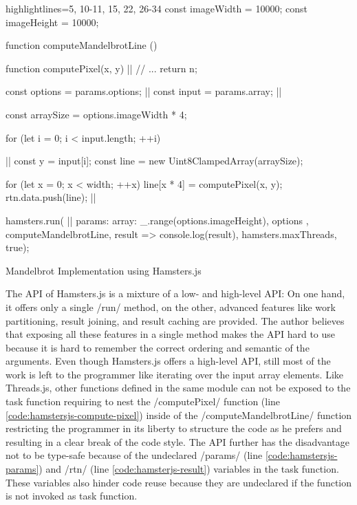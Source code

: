 \begin{listing}
\begin{javascriptcode*}{highlightlines={5, 10-11, 15, 22, 26-34}}
const imageWidth = 10000;
const imageHeight = 10000;

function computeMandelbrotLine () {
	function computePixel(x, y) {|$\label{code:hamstersjs-compute-pixel}$|
		// ...
		return n;
	}

	const options = params.options; |$\label{code:hamstersjs-params}$|
	const input = params.array; |$\label{code:hamstersjs-params-two}$|

	const arraySize = options.imageWidth * 4;

	for (let i = 0; i < input.length; ++i) {|$\label{code:hamsterjs-iterate}$|
		const y = input[i];
		const line = new Uint8ClampedArray(arraySize);
		
		for (let x = 0; x < width; ++x) {
			line[x * 4] = computePixel(x, y);
		}
		rtn.data.push(line); |$\label{code:hamsterjs-result}$|
	}
}

hamsters.run( |$\label{code:hamsterjs-start}$|
	params: {
		array: _.range(options.imageHeight),
		options
	},  
	computeMandelbrotLine, 
	result => console.log(result), 
	hamsters.maxThreads, 
	true);
\end{javascriptcode*}
\caption{Mandelbrot Implementation using Hamsters.js}
\label{fig:mandelbrot-hamsterjs}
\end{listing}

The API of Hamsters.js is a mixture of a low- and high-level API: On one hand, it offers only a single \javascriptinline/run/ method, on the other, advanced features like work partitioning, result joining, and result caching are provided. The author believes that exposing all these features in a single method makes the API hard to use because it is hard to remember the correct ordering and semantic of the arguments. Even though Hamsters.js offers a high-level API, still most of the work is left to the programmer like iterating over the input array elements. Like Threads.js, other functions defined in the same module can not be exposed to the task function requiring to nest the \javascriptinline/computePixel/ function (line \ref{code:hamstersjs-compute-pixel}) inside of the \javascriptinline/computeMandelbrotLine/ function restricting the programmer in its liberty to structure the code as he prefers and resulting in a clear break of the code style. The API further has the disadvantage not to be type-safe because of the undeclared \javascriptinline/params/ (line \ref{code:hamstersjs-params}) and \javascriptinline/rtn/ (line \ref{code:hamsterjs-result}) variables in the task function. These variables also hinder code reuse because they are undeclared if the function is not invoked as task function.


